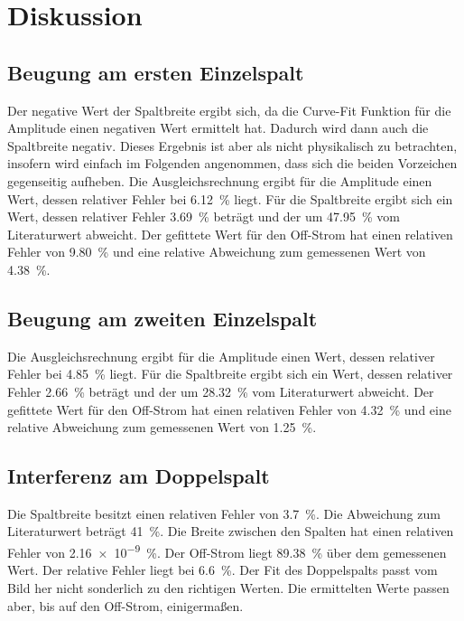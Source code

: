 \section{Diskussion}
\label{sec:Diskussion}


\subsection{Beugung am ersten Einzelspalt}
Der negative Wert der Spaltbreite ergibt sich, da die Curve-Fit Funktion für die Amplitude einen negativen Wert ermittelt hat. Dadurch wird dann auch die Spaltbreite negativ. Dieses Ergebnis ist aber als nicht physikalisch zu betrachten, insofern wird einfach im Folgenden angenommen, dass sich die beiden Vorzeichen gegenseitig aufheben. 
Die Ausgleichsrechnung ergibt für die Amplitude einen Wert, dessen relativer Fehler bei \SI{6.12}{\percent} liegt. Für die Spaltbreite ergibt sich ein Wert, dessen relativer Fehler \SI{3.69}{\percent} beträgt und der um \SI{47.95}{\percent} vom Literaturwert abweicht.
Der gefittete Wert für den Off-Strom hat einen relativen Fehler von \SI{9.80}{\percent} und eine relative Abweichung zum gemessenen Wert von \SI{4.38}{\percent}.


\subsection{Beugung am zweiten Einzelspalt}
Die Ausgleichsrechnung ergibt für die Amplitude einen Wert, dessen relativer Fehler bei \SI{4.85}{\percent} liegt. Für die Spaltbreite ergibt sich ein Wert, dessen relativer Fehler \SI{2.66}{\percent} beträgt und der um \SI{28.32}{\percent} vom Literaturwert abweicht.
Der gefittete Wert für den Off-Strom hat einen relativen Fehler von \SI{4.32}{\percent} und eine relative Abweichung zum gemessenen Wert von \SI{1.25}{\percent}.

\subsection{Interferenz am Doppelspalt}
Die Spaltbreite besitzt einen relativen Fehler von \SI{3.7}{\percent}. Die Abweichung zum Literaturwert beträgt \SI{41}{\percent}.  
Die Breite zwischen den Spalten hat einen relativen Fehler von \SI{2.16e-9}{\percent}. Der Off-Strom liegt \SI{89.38}{\percent} über dem gemessenen Wert. Der relative Fehler liegt bei \SI{6.6}{\percent}. Der Fit des Doppelspalts passt vom Bild her nicht sonderlich zu den richtigen Werten. Die ermittelten Werte passen aber, bis auf den Off-Strom, einigermaßen. 

